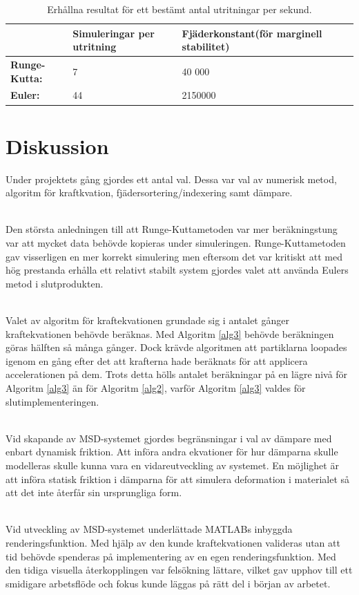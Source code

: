 \documentclass[a4paper,12pt,oneside,final,swedish]{extarticle}
\begin{document}
\begin{table}[htbp]
    \caption{Erhållna resultat för ett bestämt antal utritningar per sekund.}
    \label{table_example2}
    \begin{tabular*}{\hsize}{lllll}
      \hline %
       & \bfseries Simuleringar per utritning & \bfseries Fjäderkonstant(för marginell stabilitet)\\
      \hline
      \bfseries Runge-Kutta: & 7 & 40 000\\
      \bfseries Euler: & 44 & 2150000\\
      \hline
    \end{tabular*}
\end{table}
\pagebreak
\section{Diskussion}
Under projektets gång gjordes ett antal val. Dessa var val av numerisk metod, algoritm för kraftkvation, fjädersortering/indexering samt dämpare.

\noindent\\Den största anledningen till att Runge-Kuttametoden var mer beräkningstung var att mycket data behövde kopieras under simuleringen. Runge-Kuttametoden gav visserligen en mer korrekt simulering men eftersom det var kritiskt att med hög prestanda erhålla ett relativt stabilt system gjordes valet att använda Eulers metod i slutprodukten.

\noindent\\Valet av algoritm för kraftekvationen grundade sig i antalet gånger kraftekvationen behövde beräknas. Med Algoritm \ref{alg3} behövde beräkningen göras hälften så många gånger. Dock krävde algoritmen att partiklarna loopades igenom en gång efter det att krafterna hade beräknats för att applicera accelerationen på dem. Trots detta hölls antalet beräkningar på en lägre nivå för Algoritm \ref{alg3} än för Algoritm \ref{alg2}, varför Algoritm \ref{alg3} valdes för slutimplementeringen.

\noindent\\Vid skapande av MSD-systemet gjordes begränsningar i val av dämpare med enbart dynamisk friktion. Att införa andra ekvationer för hur dämparna skulle modelleras skulle kunna vara en vidareutveckling av systemet. En möjlighet är att införa statisk friktion i dämparna för att simulera deformation i materialet så att det inte återfår sin ursprungliga form.

\noindent\\Vid utveckling av MSD-systemet underlättade MATLABs inbyggda renderingsfunktion. Med hjälp av den kunde kraftekvationen valideras utan att tid behövde spenderas på implementering av en egen renderingsfunktion. Med den tidiga visuella återkopplingen var felsökning lättare, vilket gav upphov till ett smidigare arbetsflöde och fokus kunde läggas på rätt del i början av arbetet.
\end{document}
